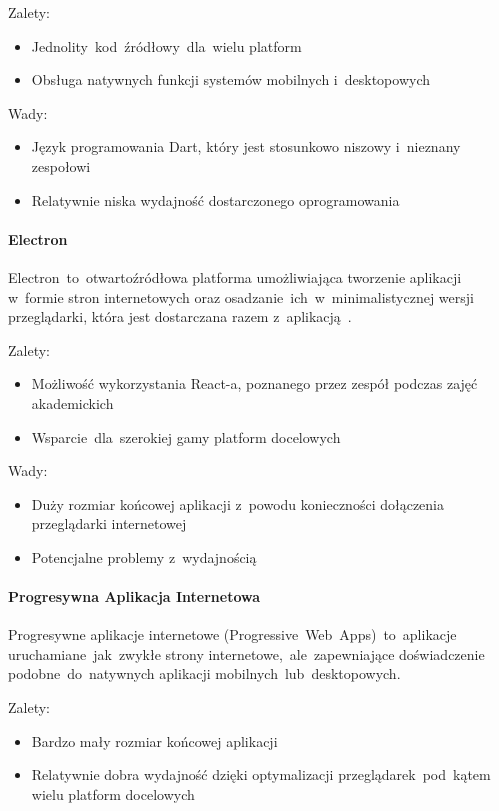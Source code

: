 Zalety:
\begin{itemize}
    \item Jednolity~kod~źródłowy~dla~wielu platform
    \item Obsługa natywnych funkcji systemów mobilnych i~desktopowych
\end{itemize}

Wady:
\begin{itemize}
    \item Język programowania Dart, który jest stosunkowo niszowy i~nieznany zespołowi
    \item Relatywnie niska wydajność dostarczonego oprogramowania\cite{flutter-perf}
\end{itemize}

\paragraph{Electron}
Electron~to~otwartoźródłowa platforma umożliwiająca tworzenie aplikacji w~formie stron internetowych oraz osadzanie~ich~w~minimalistycznej wersji przeglądarki, która jest dostarczana razem z~aplikacją~\cite{electron-in-action}.

Zalety:
\begin{itemize}
    \item Możliwość wykorzystania React-a, poznanego przez zespół podczas zajęć akademickich
    \item Wsparcie~dla~szerokiej gamy platform docelowych
\end{itemize}

Wady:
\begin{itemize}
    \item Duży rozmiar końcowej aplikacji z~powodu konieczności dołączenia przeglądarki internetowej
    \item Potencjalne problemy z~wydajnością
\end{itemize}

\paragraph{Progresywna Aplikacja Internetowa}
Progresywne aplikacje internetowe (Progressive~Web~Apps)~to~aplikacje uruchamiane~jak~zwykłe strony internetowe,~ale~zapewniające doświadczenie podobne~do~natywnych aplikacji mobilnych~lub~desktopowych.\cite{pwa-book}

Zalety:
\begin{itemize}
    \item Bardzo mały rozmiar końcowej aplikacji
    \item Relatywnie dobra wydajność dzięki optymalizacji przeglądarek~pod~kątem wielu platform docelowych
\end{itemize}


